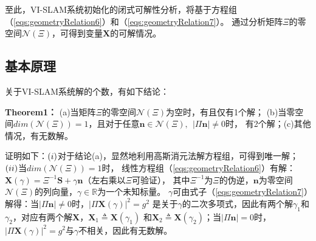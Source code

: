 \documentclass{article}
\begin{document}
\par
至此，VI-SLAM系统初始化的闭式可解性分析，将基于方程组（\ref{eqs:geometryRelation6}）和（\ref{eqs:geometryRelation7}）。
通过分析矩阵$\Xi$的零空间$\mathcal{N}(\Xi)$，可得到变量$\textbf{X}$的可解情况。

\subsection{基本原理}
关于VI-SLAM系统解的个数，有如下结论：
\par
\textbf{Theorem1：} (a)当矩阵$\Xi$的零空间$\mathcal{N}(\Xi)$为空时，有且仅有1个解；
(b)当零空间$dim(\mathcal{N}(\Xi))=1$，且对于任意$\textbf{n}\in\mathcal{N}(\Xi),\ \ |\Pi\textbf{n}|\not=0$时，
有2个解；(c)其他情况，有无数解。
\par
证明如下：$(\romannumeral1)$对于结论(a)，显然地利用高斯消元法解方程组，可得到唯一解；$(\romannumeral2)$当$dim(\mathcal{N}(\Xi))=1$时，
线性方程组（\ref{eqs:geometryRelation6}）有解：$\textbf{X}(\gamma)=\Xi^{-1}\textbf{S}+\gamma\textbf{n}$（左右乘以$\Xi$可验证），
其中$\Xi^{-1}$为$\Xi$的伪逆，$\textbf{n}$为零空间$\mathcal{N}(\Xi)$的列向量，$\gamma\in\mathbb{R}$为一个未知标量。
$\gamma$可由式子（\ref{eqs:geometryRelation7}）解得：当$|\Pi\textbf{n}|\not=0$时，$|\Pi\textbf{X}(\gamma)|^2=g^2$
是关于$\gamma$的二次多项式，因此有两个解$\gamma_1$和$\gamma_2$，对应有两个解$\textbf{X}$，$\textbf{X}_1\triangleq \textbf{X}(\gamma_1)$
和$\textbf{X}_2\triangleq \textbf{X}(\gamma_2)$；当$|\Pi\textbf{n}|=0$时，$|\Pi\textbf{X}(\gamma)|^2=g^2$与$\gamma$不相关，因此有无数解。
\end{document}
